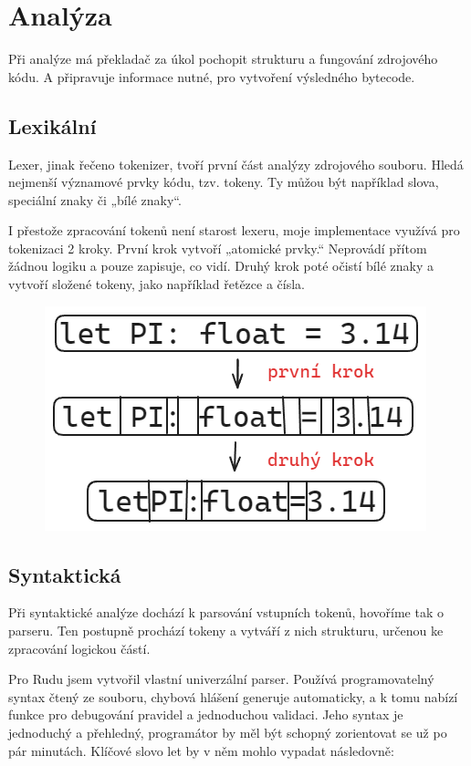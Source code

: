 \documentclass[12pt, a4paper,
twoside,        %
openright
]{report}
\begin{document}
	\section{Analýza}
	
	Při analýze má překladač za úkol pochopit strukturu a fungování zdrojového kódu. A připravuje informace nutné, pro vytvoření výsledného bytecode.
	
	\subsection{Lexikální}
	
	Lexer, jinak řečeno tokenizer, tvoří první část analýzy zdrojového souboru. Hledá nejmenší významové prvky kódu, tzv. tokeny. Ty můžou být například slova, speciální znaky či „bílé znaky“.
	
	I přestože zpracování tokenů není starost lexeru, moje implementace využívá pro tokenizaci 2 kroky. První krok vytvoří „atomické prvky.“ Neprovádí přítom žádnou logiku a pouze zapisuje, co vidí. Druhý krok poté očistí bílé znaky a vytvoří složené tokeny, jako například řetězce a čísla.
	
	\begin{figure}[h]
		\centering
		\includegraphics[width=0.5\linewidth]{image/lexer.png}
	\end{figure}
	
	\subsection{Syntaktická}
	
	Při syntaktické analýze dochází k parsování vstupních tokenů, hovoříme tak o parseru. Ten postupně prochází tokeny a vytváří z nich strukturu, určenou ke zpracování logickou částí.
	
	Pro Rudu jsem vytvořil vlastní univerzální parser. Používá programovatelný syntax čtený ze souboru, chybová hlášení generuje automaticky, a k tomu nabízí funkce pro debugování pravidel a jednoduchou validaci. Jeho syntax je jednoduchý a přehledný, programátor by měl být schopný zorientovat se už po pár minutách. Klíčové slovo let by v něm mohlo vypadat následovně:
	
\end{document}
